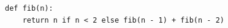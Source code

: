 \documentclass{article}
\begin{document}
\begin{verbatim}
def fib(n):
    return n if n < 2 else fib(n - 1) + fib(n - 2)
\end{verbatim}
\end{document}
